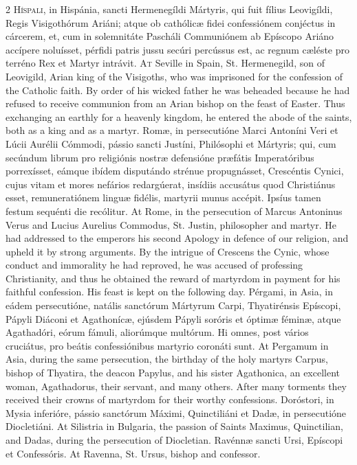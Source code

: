 \begin{paracol}{2}
\lettrine[lines=2]{H}{íspali,} in Hispánia, sancti Hermenegíldi Mártyris, qui fuit fílius Leovigíldi, Regis Visigothórum 
 Ariáni; atque ob cathólicæ fidei confessiónem conjéctus in cárcerem, et, cum 
 in solemnitáte Pascháli Communiónem ab Epíscopo Ariáno accípere noluísset, 
 pérfidi patris jussu secúri percússus est, ac regnum cæléste pro terréno Rex 
 et Martyr intrávit.
\switchcolumn
{}
\lettrine[lines=2]{A}{t} Seville in Spain, St. 
 Hermenegild, son of Leovigild, Arian king of the Visigoths, who was 
 imprisoned for the confession of the Catholic faith. By order of his 
 wicked father he was beheaded because he had refused to receive communion 
 from an Arian bishop on the feast of Easter. Thus exchanging an 
 earthly for a heavenly kingdom, he entered the abode of the saints, both as 
 a king and as a martyr.
\switchcolumn*
{}
Romæ, in persecutióne 
 Marci Antoníni Veri et Lúcii Aurélii Cómmodi, pássio sancti Justíni, 
 Philósophi et Mártyris; qui, cum secúndum librum pro religiónis nostræ 
 defensióne præfátis Imperatóribus porrexísset, eámque ibídem disputándo 
 strénue propugnásset, Crescéntis Cynici, cujus vitam et mores nefários 
 redargúerat, insídiis accusátus quod Christiánus esset, remuneratiónem 
 linguæ fidélis, martyrii munus accépit. Ipsíus tamen festum sequénti 
 die recólitur.
\switchcolumn
{}
At Rome, in the persecution of 
 Marcus Antoninus Verus and Lucius Aurelius Commodus, St. Justin, philosopher 
 and martyr. He had addressed to the emperors his second Apology in 
 defence of our religion, and upheld it by strong arguments. By the 
 intrigue of Crescens the Cynic, whose conduct and immorality he had 
 reproved, he was accused of professing Christianity, and thus he obtained 
 the reward of martyrdom in payment for his faithful confession. His 
 feast is kept on the following day.
\switchcolumn*
{}
Pérgami, in Asia, in 
 eádem persecutióne, natális sanctórum Mártyrum Carpi, Thyatirénsis Epíscopi, 
 Pápyli Diáconi et Agathonícæ, ejúsdem Pápyli soróris et 
 óptimæ féminæ, atque 
 Agathadóri, eórum fámuli, aliorúmque multórum. Hi omnes, post vários 
 cruciátus, pro beátis confessiónibus martyrio coronáti sunt.
\switchcolumn
{}
At Pergamum in Asia, during the 
 same persecution, the birthday of the holy martyrs Carpus, bishop of 
 Thyatira, the deacon Papylus, and his sister Agathonica, an excellent woman, 
 Agathadorus, their servant, and many others. After many torments they 
 received their crowns of martyrdom for their worthy confessions.
\switchcolumn*
{}
Doróstori, in Mysia 
 inferióre, pássio sanctórum Máximi, Quinctiliáni et Dadæ, in persecutióne 
 Diocletiáni.
\switchcolumn
{}
At Silistria in Bulgaria, the 
 passion of Saints Maximus, Quinctilian, and Dadas, during the persecution of 
 Diocletian.
\switchcolumn*
{}
Ravénnæ sancti Ursi, 
 Epíscopi et Confessóris.
\switchcolumn
{}
At Ravenna, St. Ursus, bishop and 
 confessor.
\switchcolumn*
{}
\end{paracol}


